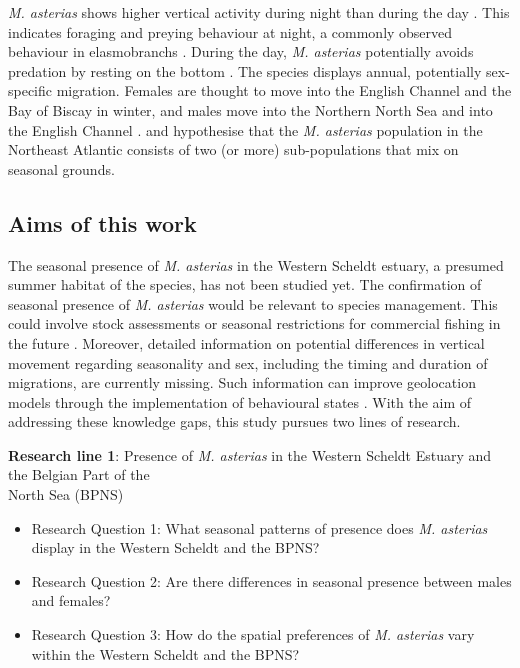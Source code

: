 \documentclass[
  authoryear,
  review,
  3p]{elsarticle}
\providecommand{\tightlist}{%
  \setlength{\itemsep}{0pt}\setlength{\parskip}{0pt}}\usepackage{longtable,booktabs,array}
\begin{document}
\emph{M. asterias} shows higher vertical activity during night than
during the day \citep{griffiths_2020}. This indicates foraging and
preying behaviour at night, a commonly observed behaviour in
elasmobranchs \citep{sims_2006}. During the day, \emph{M. asterias}
potentially avoids predation by resting on the bottom
\citep{griffiths_2020}. The species displays annual, potentially
sex-specific migration. Females are thought to move into the English
Channel and the Bay of Biscay in winter, and males move into the
Northern North Sea and into the English Channel
\citep{breve_2016, breve_2020, griffiths_2020}. \citet{breve_2016} and
\citet{griffiths_2020} hypothesise that the \emph{M. asterias}
population in the Northeast Atlantic consists of two (or more)
sub-populations that mix on seasonal grounds.

\hypertarget{sec-intro-aims}{%
\subsection{Aims of this work}\label{sec-intro-aims}}

The seasonal presence of \emph{M. asterias} in the Western Scheldt
estuary, a presumed summer habitat of the species, has not been studied
yet. The confirmation of seasonal presence of \emph{M. asterias} would
be relevant to species management. This could involve stock assessments
or seasonal restrictions for commercial fishing in the future
\citep{benot_2003}. Moreover, detailed information on potential
differences in vertical movement regarding seasonality and sex,
including the timing and duration of migrations, are currently missing.
Such information can improve geolocation models through the
implementation of behavioural states \citep{pedersen_2008}. With the aim
of addressing these knowledge gaps, this study pursues two lines of
research.

\textbf{Research line 1}: Presence of \emph{M. asterias} in the Western
Scheldt Estuary and the Belgian Part of the\\
\hspace*{0.333em}\hspace*{0.333em}North Sea (BPNS)

\begin{itemize}
\tightlist
\item
  Research Question 1: What seasonal patterns of presence does \emph{M.
  asterias} display in the Western Scheldt and the BPNS?
\item
  Research Question 2: Are there differences in seasonal presence
  between males and females?
\item
  Research Question 3: How do the spatial preferences of \emph{M.
  asterias} vary within the Western Scheldt and the BPNS?
\end{itemize}
\end{document}

